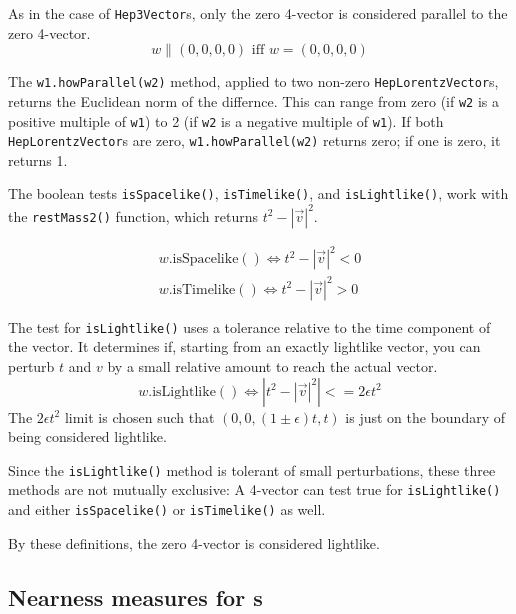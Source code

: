 \documentclass[twoside,12pt]{article}
\def \SV {{\tt Hep3Vector}}
\def \LV {{\tt HepLorentzVector}}
\begin{document}
As in the case of \SV s, only the zero 4-vector is considered parallel to
the zero 4-vector.
\begin{equation}
\label{eq:wisPar:2}
  w \parallel (0, 0, 0, 0) \mbox{ iff } w = (0, 0, 0, 0)
\end{equation}

The {\tt w1.howParallel(w2)} method, applied to two non-zero \LV s,
returns the Euclidean norm of the differnce.  This can range from zero
(if {\tt w2} is a positive multiple of {\tt w1}) to
2 (if {\tt w2} is a negative multiple of {\tt w1}).  If both \LV s are
zero, {\tt w1.howParallel(w2)} returns zero; if one is zero, it returns 1.

\vspace{.25 in}

The boolean tests {\tt isSpacelike()}, {\tt isTimelike()},
and {\tt isLightlike()},
work with the {\tt restMass2()} function, which returns $t^2 - |\vec{v}|^2$.

\begin{eqnarray}
\label{eq:wisSl}
  w\mbox{.isSpacelike}() \Longleftrightarrow t^2 - |\vec{v}|^2 < 0 \\
\label{eq:wisTl}
  w\mbox{.isTimelike}()  \Longleftrightarrow t^2 - |\vec{v}|^2 > 0
\end{eqnarray}

The test for {\tt isLightlike()}
uses a tolerance relative to the time component of the vector.
It determines if, starting from an exactly lightlike vector, you can perturb
$t$ and $v$ by a small relative amount to reach the actual
vector.
\begin{equation}
\label{eq:wisLl}
  w\mbox{.isLightlike}() \Longleftrightarrow
  \left| t^2 - |\vec{v}|^2 \right| <= 2 \epsilon t^2
\end{equation}
\noindent
The $2 \epsilon t^2$ limit is chosen such that $(0, 0, (1\pm\epsilon)t, t)$
is just on the boundary of being considered lightlike.

Since the {\tt isLightlike()} method is tolerant of small perturbations,
these three methods are not mutually exclusive: A 4-vector can test true for
{\tt isLightlike()}
and either {\tt isSpacelike()} or {\tt isTimelike()} as well.

By these definitions, the zero 4-vector is considered lightlike.

\subsection{Nearness measures for \protect\LV s}
\end{document}
